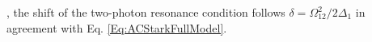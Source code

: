 , the shift of the two-photon resonance condition follows $\delta={\Omega_{12}^{2}}/{2\Delta_{1}}$ in agreement with Eq. \ref{Eq:ACStarkFullModel}.





